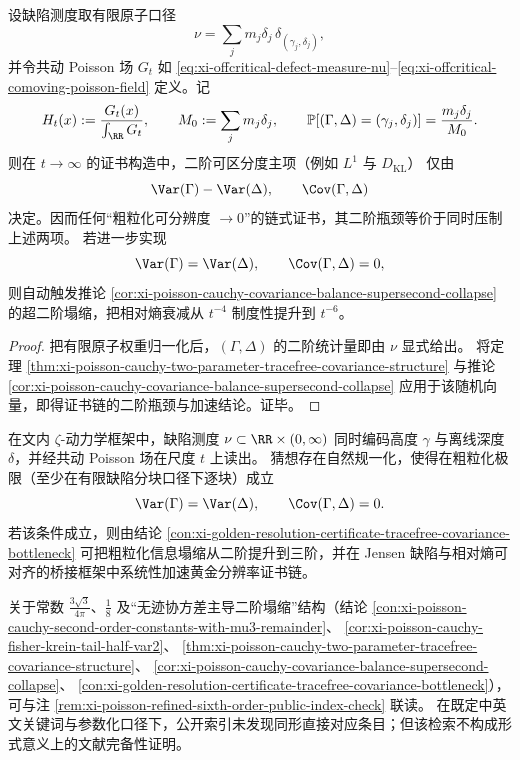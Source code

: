\begin{conclusion}\label{con:xi-golden-resolution-certificate-tracefree-covariance-bottleneck}
设缺陷测度取有限原子口径
\[
\nu=\sum_j m_j\delta_j\,\delta_{(\gamma_j,\delta_j)},
\]
并令共动 Poisson 场 \(G_t\) 如
\eqref{eq:xi-offcritical-defect-measure-nu}--\eqref{eq:xi-offcritical-comoving-poisson-field}
定义。记
\[
H_t(x):=\frac{G_t(x)}{\int_{\RR}G_t},\qquad
M_0:=\sum_j m_j\delta_j,\qquad
\mathbb P\!\left[(\Gamma,\Delta)=(\gamma_j,\delta_j)\right]=\frac{m_j\delta_j}{M_0}.
\]
则在 \(t\to\infty\) 的证书构造中，二阶可区分度主项（例如 \(L^1\) 与 \(D_{\mathrm{KL}}\)）
仅由
\[
\Var(\Gamma)-\Var(\Delta),\qquad
\Cov(\Gamma,\Delta)
\]
决定。因而任何“粗粒化可分辨度 \(\to0\)”的链式证书，其二阶瓶颈等价于同时压制上述两项。
若进一步实现
\[
\Var(\Gamma)=\Var(\Delta),\qquad \Cov(\Gamma,\Delta)=0,
\]
则自动触发推论
\ref{cor:xi-poisson-cauchy-covariance-balance-supersecond-collapse}
的超二阶塌缩，把相对熵衰减从 \(t^{-4}\) 制度性提升到 \(t^{-6}\)。
\end{conclusion}
\begin{proof}
把有限原子权重归一化后，\((\Gamma,\Delta)\) 的二阶统计量即由 \(\nu\) 显式给出。
将定理
\ref{thm:xi-poisson-cauchy-two-parameter-tracefree-covariance-structure}
与推论
\ref{cor:xi-poisson-cauchy-covariance-balance-supersecond-collapse}
应用于该随机向量，即得证书链的二阶瓶颈与加速结论。证毕。
\end{proof}
\begin{conjecture}\label{conj:xi-zeta-comoving-defect-measure-covariance-balance}
在文内 \(\zeta\)-动力学框架中，缺陷测度
\(
\nu\subset\RR\times(0,\infty)
\)
同时编码高度 \(\gamma\) 与离线深度 \(\delta\)，并经共动 Poisson 场在尺度 \(t\) 上读出。
猜想存在自然规一化，使得在粗粒化极限（至少在有限缺陷分块口径下逐块）成立
\[
\Var(\Gamma)=\Var(\Delta),\qquad
\Cov(\Gamma,\Delta)=0.
\]
若该条件成立，则由结论
\ref{con:xi-golden-resolution-certificate-tracefree-covariance-bottleneck}
可把粗粒化信息塌缩从二阶提升到三阶，并在 Jensen 缺陷与相对熵可对齐的桥接框架中系统性加速黄金分辨率证书链。
\end{conjecture}
\begin{remark}[同形公开索引排查的范围说明]\label{rem:xi-poisson-profile-divergence-public-index-note}
关于常数
\(
\frac{3\sqrt3}{4\pi}
\)、\(
\frac18
\)
及“无迹协方差主导二阶塌缩”结构（结论
\ref{con:xi-poisson-cauchy-second-order-constants-with-mu3-remainder}、
\ref{cor:xi-poisson-cauchy-fisher-krein-tail-half-var2}、
\ref{thm:xi-poisson-cauchy-two-parameter-tracefree-covariance-structure}、
\ref{cor:xi-poisson-cauchy-covariance-balance-supersecond-collapse}、
\ref{con:xi-golden-resolution-certificate-tracefree-covariance-bottleneck}），
可与注 \ref{rem:xi-poisson-refined-sixth-order-public-index-check} 联读。
在既定中英文关键词与参数化口径下，公开索引未发现同形直接对应条目；但该检索不构成形式意义上的文献完备性证明。
\end{remark}
\endinput